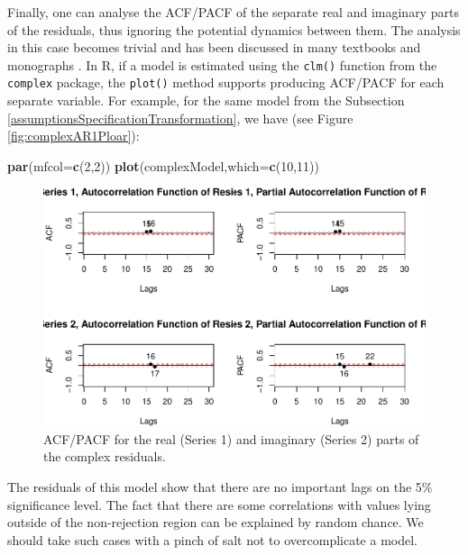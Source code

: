 \documentclass[
]{book}
\newenvironment{Shaded}{\begin{snugshade}}{\end{snugshade}}
\newcommand{\DataTypeTok}[1]{\textcolor[rgb]{0.13,0.29,0.53}{#1}}
\newcommand{\DecValTok}[1]{\textcolor[rgb]{0.00,0.00,0.81}{#1}}
\newcommand{\KeywordTok}[1]{\textcolor[rgb]{0.13,0.29,0.53}{\textbf{#1}}}
\newcommand{\NormalTok}[1]{#1}
\begin{document}
Finally, one can analyse the ACF/PACF of the separate real and imaginary parts of the residuals, thus ignoring the potential dynamics between them. The analysis in this case becomes trivial and has been discussed in many textbooks and monographs \citep[for example, see][]{SvetunkovAdam}. In R, if a model is estimated using the \texttt{clm()} function from the \texttt{complex} package, the \texttt{plot()} method supports producing ACF/PACF for each separate variable. For example, for the same model from the Subsection \ref{assumptionsSpecificationTransformation}, we have (see Figure \ref{fig:complexAR1Ploar}):

\begin{Shaded}
\begin{Highlighting}[]
\KeywordTok{par}\NormalTok{(}\DataTypeTok{mfcol=}\KeywordTok{c}\NormalTok{(}\DecValTok{2}\NormalTok{,}\DecValTok{2}\NormalTok{))}
\KeywordTok{plot}\NormalTok{(complexModel,}\DataTypeTok{which=}\KeywordTok{c}\NormalTok{(}\DecValTok{10}\NormalTok{,}\DecValTok{11}\NormalTok{))}
\end{Highlighting}
\end{Shaded}

\begin{figure}
\centering
\includegraphics{Svetunkov---Svetunkov---Complex-Valued-Econometrics_files/figure-latex/complexARDiagnosticsACFPACF-1.pdf}
\caption{\label{fig:complexARDiagnosticsACFPACF}ACF/PACF for the real (Series 1) and imaginary (Series 2) parts of the complex residuals.}
\end{figure}

The residuals of this model show that there are no important lags on the 5\% significance level. The fact that there are some correlations with values lying outside of the non-rejection region can be explained by random chance. We should take such cases with a pinch of salt not to overcomplicate a model.
\end{document}
